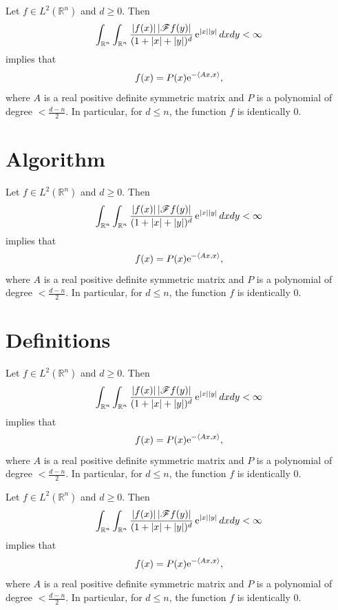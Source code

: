\documentclass{amse}
\numberwithin{equation}{section}
\begin{document}
\begin{cor}
Let $f\in L^{2}(\mathbb R^{n})$ and $d \geq
0$. Then
\begin{equation}
\int_{\mathbb R^{n}} \int_{\mathbb R^{n}} \frac{|f(x)|\,
|\mathscr{F}{f}(y)|}{(1+|x|+|y|)^{d}}\, {\rm e}^{|x||y|}\,dxdy <
\infty
\end{equation}
implies that
$$
f(x)=P(x){\rm e}^{-\langle Ax,x\rangle},
$$
where $A$ is a real positive definite symmetric matrix and $P$ is
a polynomial of degree $<\frac{d-n}{2}$. In particular, for $d\leq
n$, the function $f$ is identically $0.$
\end{cor}


\section{Algorithm}

\begin{algo}
Let $f\in L^{2}(\mathbb R^{n})$ and $d \geq
0$. Then
\begin{equation}
\int_{\mathbb R^{n}} \int_{\mathbb R^{n}} \frac{|f(x)|\,
|\mathscr{F}{f}(y)|}{(1+|x|+|y|)^{d}}\, {\rm e}^{|x||y|}\,dxdy <
\infty
\end{equation}
implies that
$$
f(x)=P(x){\rm e}^{-\langle Ax,x\rangle},
$$
where $A$ is a real positive definite symmetric matrix and $P$ is
a polynomial of degree $<\frac{d-n}{2}$. In particular, for $d\leq
n$, the function $f$ is identically $0.$
\end{algo}


\section{Definitions}

\begin{defn}
Let $f\in L^{2}(\mathbb R^{n})$ and $d \geq
0$. Then
\begin{equation}
\int_{\mathbb R^{n}} \int_{\mathbb R^{n}} \frac{|f(x)|\,
|\mathscr{F}{f}(y)|}{(1+|x|+|y|)^{d}}\, {\rm e}^{|x||y|}\,dxdy <
\infty
\end{equation}
implies that
$$
f(x)=P(x){\rm e}^{-\langle Ax,x\rangle},
$$
where $A$ is a real positive definite symmetric matrix and $P$ is
a polynomial of degree $<\frac{d-n}{2}$. In particular, for $d\leq
n$, the function $f$ is identically $0.$
\end{defn}


\begin{conj}
Let $f\in L^{2}(\mathbb R^{n})$ and $d \geq
0$. Then
\begin{equation}
\int_{\mathbb R^{n}} \int_{\mathbb R^{n}} \frac{|f(x)|\,
|\mathscr{F}{f}(y)|}{(1+|x|+|y|)^{d}}\, {\rm e}^{|x||y|}\,dxdy <
\infty
\end{equation}
implies that
$$
f(x)=P(x){\rm e}^{-\langle Ax,x\rangle},
$$
where $A$ is a real positive definite symmetric matrix and $P$ is
a polynomial of degree $<\frac{d-n}{2}$. In particular, for $d\leq
n$, the function $f$ is identically $0.$
\end{conj}
\end{document}
